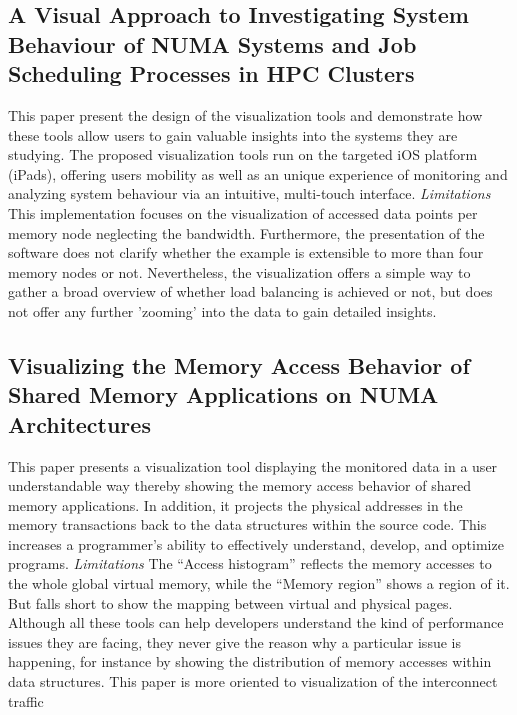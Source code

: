 \subsection{A Visual Approach to Investigating System Behaviour of NUMA Systems and Job Scheduling Processes in HPC Clusters} 
This paper present the design of the visualization tools and demonstrate how these tools allow users to gain valuable insights into the systems they are studying. The proposed visualization tools run on the targeted iOS platform (iPads), offering users mobility as well as an unique experience of monitoring and analyzing system behaviour via an intuitive, multi-touch interface.\newline
\textit{Limitations}\newline
This implementation focuses on the visualization of accessed data points per memory node neglecting the bandwidth.
Furthermore, the presentation of the software does not clarify whether the example is extensible to more than four memory nodes or not.
Nevertheless, the visualization offers a simple way to gather a broad overview of whether load balancing is achieved or not, but does not offer any further ’zooming’ into the data to gain detailed insights.

\subsection{Visualizing the Memory Access Behavior of Shared Memory Applications on NUMA Architectures}
This paper presents a visualization tool displaying the monitored data in a user understandable way thereby showing the memory access behavior of shared memory applications. In addition, it projects the physical addresses in the memory transactions back to the data structures within the source code. This increases a programmer’s ability to effectively understand, develop, and optimize programs.\newline
\textit{Limitations}\newline
The “Access histogram” reflects the memory accesses to the whole global virtual memory, while the “Memory region” shows a region of it. But falls short to show the mapping between virtual and physical pages.
Although all these tools can help developers understand the kind of performance issues they are facing, they never give the reason why a particular issue is happening, for instance by showing the distribution of memory accesses within data structures.
This paper is more oriented to visualization of the interconnect traffic

